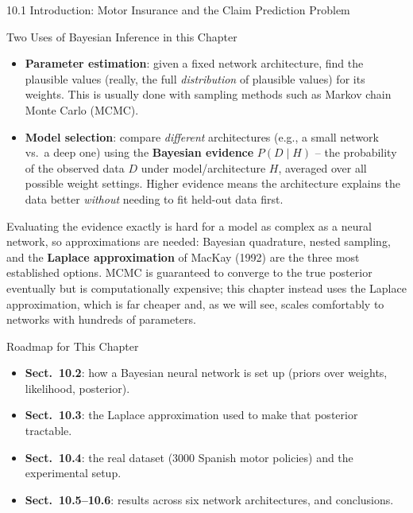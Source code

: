 \documentclass[aspectratio=169,10pt]{beamer}
\begin{document}
\begin{frame}[allowframebreaks]{10.1 Introduction: Motor Insurance and the Claim Prediction Problem}
  \framebreak

  \begin{block}{Two Uses of Bayesian Inference in this Chapter}
    \begin{itemize}
      \item \textbf{Parameter estimation}: given a fixed network architecture,
        find the plausible values (really, the full \emph{distribution} of
        plausible values) for its weights. This is usually done with sampling
        methods such as Markov chain Monte Carlo (MCMC).
      \item \textbf{Model selection}: compare \emph{different} architectures
        (e.g., a small network vs.\ a deep one) using the \textbf{Bayesian
        evidence} $P(D \mid H)$ -- the probability of the observed data $D$
        under model/architecture $H$, averaged over all possible weight
        settings. Higher evidence means the architecture explains the data
        better \emph{without} needing to fit held-out data first.
      \end{itemize}
    Evaluating the evidence exactly is hard for a model as complex as a
    neural network, so approximations are needed: Bayesian quadrature, nested
    sampling, and the \textbf{Laplace approximation} of MacKay (1992) are the
    three most established options. MCMC is guaranteed to converge to the
    true posterior eventually but is computationally expensive; this chapter
    instead uses the Laplace approximation, which is far cheaper and, as we
    will see, scales comfortably to networks with hundreds of parameters.
  \end{block}

  \begin{exampleblock}{Roadmap for This Chapter}
    \begin{itemize}
      \item \textbf{Sect.\ 10.2}: how a Bayesian neural network is set up
        (priors over weights, likelihood, posterior).
      \item \textbf{Sect.\ 10.3}: the Laplace approximation used to make that
        posterior tractable.
      \item \textbf{Sect.\ 10.4}: the real dataset (3000 Spanish motor
        policies) and the experimental setup.
      \item \textbf{Sect.\ 10.5--10.6}: results across six network
        architectures, and conclusions.
    \end{itemize}
  \end{exampleblock}

\end{frame}
\end{document}
